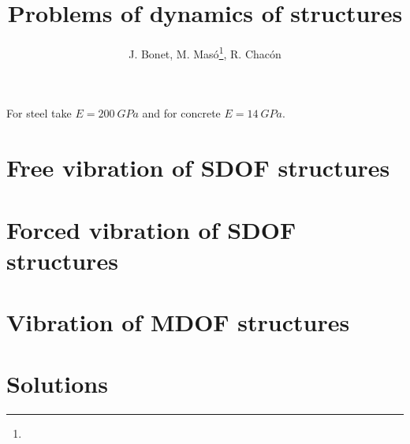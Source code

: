 \documentclass{problems}
\title[Dynamics of structures]{Problems of dynamics of structures}
\author{J. Bonet, M. Masó\thanks{}, R. Chacón}
\begin{document}
\maketitle
{}

For steel take $E=\SI{200}{GPa}$ and for concrete $E=\SI{14}{GPa}$.

\section{Free vibration of SDOF structures}





\section{Forced vibration of SDOF structures}







\section{Vibration of MDOF structures}




\newpage
\section{Solutions}
\shipoutAnswer

\printbibliography
\end{document}
